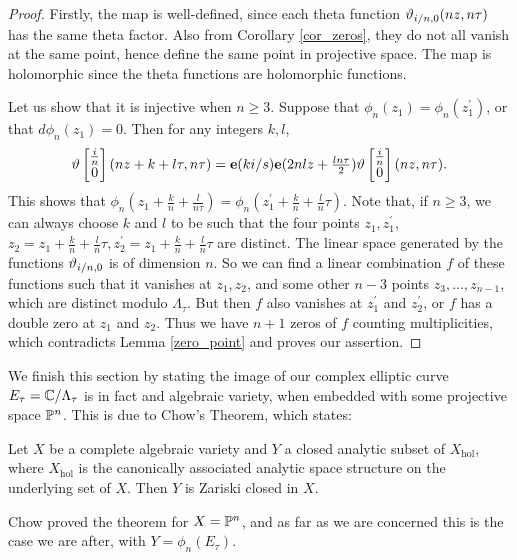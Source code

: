 \begin{proof}
	Firstly, the map is well-defined, since each theta function $\vartheta_{i/n,0}(nz,n\tau)$ has the same theta factor. Also from Corollary \ref{cor_zeros}, they do not all vanish at the same point, hence define the same point in projective space. The map is holomorphic since the theta functions are holomorphic functions.
	
	Let us show that it is injective when $n\geq 3$. Suppose that $\phi_{n}(z_{1}) = \phi_{n}(z_{1}^{\prime})$, or that $d\phi_{n}(z_{1}) = 0$. Then for any integers $k,l$,
	\begin{equation*}
		\vartheta\begin{bmatrix} \frac{i}{n}\\ 0 \end{bmatrix}(nz + k + l\tau,n\tau) = \mathbf{e}(ki/s)\mathbf{e}(2nlz + \tfrac{ln\tau}{2})\vartheta\begin{bmatrix} \frac{i}{n}\\ 0 \end{bmatrix}(nz,n\tau). 
	\end{equation*}
	This shows that $\phi_{n}(z_{1} + \tfrac{k}{n} + \tfrac{l}{n\tau}  ) = \phi_{n}(z_{1}^{\prime} + \tfrac{k}{n} + \tfrac{l}{n}\tau)$. Note that, if $n \geq 3$, we can always choose $k$ and $l$ to be such that the four points $z_{1}, z_{1}^{\prime}$, $z_{2} = z_{1} + \tfrac{k}{n} + \tfrac{l}{n}\tau, z_{2}^{\prime} = z_{1} + \tfrac{k}{n} + \tfrac{l}{n}\tau$ are distinct. The linear space generated by the functions $\vartheta_{i/n, 0}$ is of dimension $n$. So we can find a linear combination $f$ of these functions such that it vanishes at $z_{1}, z_{2}$, and some other $n-3$ points $z_{3},\ldots, z_{n-1}$, which are distinct modulo $\Lambda_{\tau}$. But then $f$ also vanishes at $z_{1}^{\prime}$ and $z_{2}^{\prime}$, or $f$ has a double zero at $z_{1}$ and $z_{2}$. Thus we have $n+1$ zeros of $f$ counting multiplicities, which contradicts Lemma \ref{zero_point} and proves our assertion.
\end{proof}

We finish this section by stating the image of our complex elliptic curve $E_{\tau} = \mathbb{C}/\Lambda_{\tau}$ is in fact and algebraic variety, when embedded with some projective space $\mathbb{P}^{n}$. This is due to Chow's Theorem, which states:\\

\begin{theorem}
	Let $X$ be a complete algebraic variety and $Y$ a closed analytic subset of $X_{\text{hol}}$, where $X_{\text{hol}}$ is the canonically associated analytic space structure on the underlying set of $X$. Then $Y$ is Zariski closed in $X$.
\end{theorem}

Chow proved the theorem for $X = \mathbb{P}^{n}$, and as far as we are concerned this is the case we are after, with $Y = \phi_{n}(E_{\tau})$.